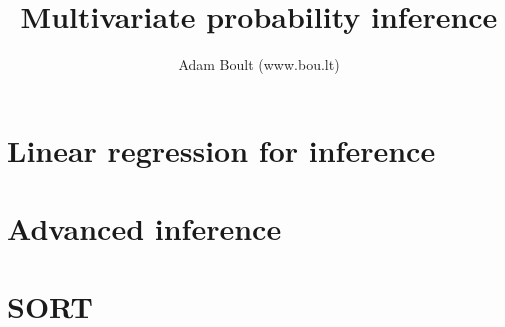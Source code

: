 \documentclass[oneside]{book}
\begin{document}
\author{Adam Boult (www.bou.lt)}
\title{Multivariate probability inference}
\maketitle

\setcounter{tocdepth}{0}
\tableofcontents



\part{Linear regression for inference}






\part{Advanced inference}






\part{SORT}

\end{document}
